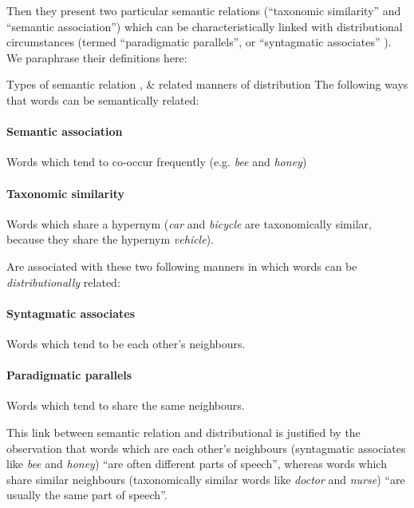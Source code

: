 Then they present two particular semantic relations (``taxonomic similarity'' and ``semantic association'') which can be characteristically linked with distributional circumstances (termed ``paradigmatic parallels'', or ``syntagmatic associates'' \textcite{shutze-1993-word-space}). We paraphrase their definitions here:
\begin{infobox}{Types of semantic relation  \parencite{turney10-from-frequen-to-meanin}, \& related manners of distribution \parencite{resnik-1995-nov}}
  The following ways that words can be semantically related: 
    \paragraph{Semantic association} Words which tend to co-occur frequently (e.g. \emph{bee} and \emph{honey})
    \paragraph{Taxonomic similarity} Words which share a hypernym (\emph{car} and \emph{bicycle} are taxonomically similar, because they share the hypernym \emph{vehicle}).

    \noindent
    Are associated with these two following manners in which words can be \emph{distributionally} related:
    \paragraph{Syntagmatic associates} Words which tend to be each other's neighbours.
      \paragraph{Paradigmatic parallels} Words which tend to share the same neighbours.
\end{infobox}
This link between semantic relation and distributional is justified by the observation that words which are each other's neighbours (syntagmatic associates like \emph{bee} and \emph{honey}) ``are often different parts of speech'', whereas words which share similar neighbours (taxonomically similar words like \emph{doctor} and \emph{nurse}) ``are usually the same part of speech''.

